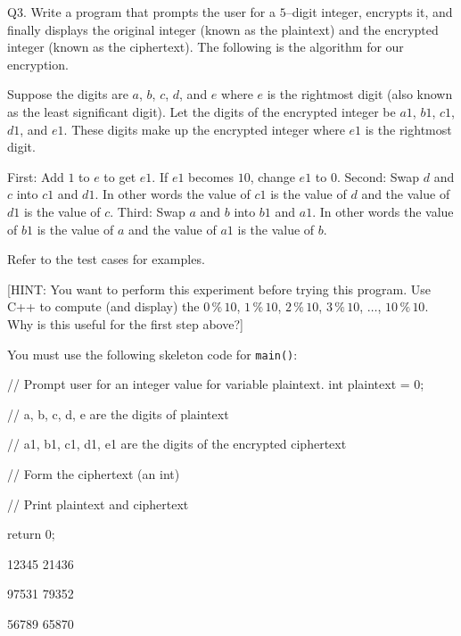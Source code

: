 Q3.
Write a program that prompts the user for a $5$--digit integer, encrypts it, and finally displays the original integer (known as the plaintext) and the encrypted integer (known as the ciphertext). The following is the algorithm for our encryption. 

Suppose the digits are $a$, $b$, $c$, $d$, and $e$ where $e$ is the rightmost digit (also known as the least significant digit). Let the digits of the encrypted integer be $a1$, $b1$, $c1$, $d1$, and $e1$. These digits make up the encrypted integer where $e1$ is the rightmost digit.
\begin{tightlist}
  \li First: Add $1$ to $e$ to get $e1$. If $e1$ becomes $10$, change $e1$ to $0$.
  \li Second: Swap $d$ and $c$ into $c1$ and $d1$. In other words the value of $c1$ is the value of $d$ and the value of $d1$ is the value of $c$.
  \li Third: Swap $a$ and $b$ into $b1$ and $a1$. In other words the value of $b1$ is the value of $a$ and the value of $a1$ is the value of $b$.
\end{tightlist}

Refer to the test cases for examples.

[HINT: You want to perform this experiment before trying this program. Use C++ to compute (and display) the $0\,\%\,10$, $1\,\%\,10$,  $2\,\%\,10$,  $3\,\%\,10$, $\dots$, $10\,\%\,10$. Why is this useful for the first step above?]

You must use the following skeleton code for \verb!main()!:
\begin{console}
// Prompt user for an integer value for variable plaintext.
int plaintext = 0;

// a, b, c, d, e are the digits of plaintext

// a1, b1, c1, d1, e1 are the digits of the encrypted ciphertext

// Form the ciphertext (an int)

// Print plaintext and ciphertext

return 0;
\end{console}

\resett
\nextt
\begin{console}[commandchars=\\\{\}]
12345 21436
\end{console}

\nextt
\begin{console}[commandchars=\\\{\}]
97531 79352
\end{console}

\nextt
\begin{console}[commandchars=\\\{\}]
56789 65870
\end{console}
